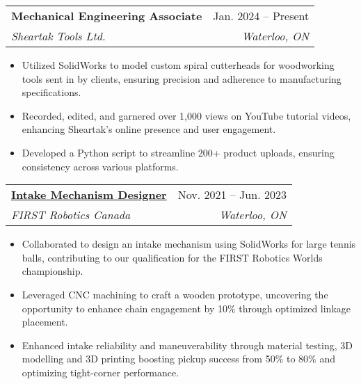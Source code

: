 \documentclass[letterpaper]{article}
\makeatletter
\newcommand{\resumeItem}[1]{
  \item\small{
    {#1 \vspace{-2pt}}
  }
}
\newcommand{\resumeSubheading}[4]{
  \vspace{-2pt}\item
    \begin{tabular*}{0.97\textwidth}[t]{l@{\extracolsep{\fill}}r}
      \textbf{#1} & #2 \\
      \textit{\small#3} & \textit{\small #4} \\
    \end{tabular*}\vspace{-7pt}
}
\newcommand{\resumeSubSubheading}[2]{
    \item
    \begin{tabular*}{0.97\textwidth}{l@{\extracolsep{\fill}}r}
      \textit{\small#1} & \textit{\small #2} \\
    \end{tabular*}\vspace{-7pt}
}
\newcommand{\resumeSubHeadingListEnd}{\end{itemize}}
\newcommand{\resumeItemListStart}{\begin{itemize}}
\newcommand{\resumeItemListEnd}{\end{itemize}\vspace{-5pt}}
\makeatother
\begin{document}
    \resumeSubheading
      {Mechanical Engineering Associate}{Jan. 2024 -- Present}
      {Sheartak Tools Ltd.}{Waterloo, ON}
      \resumeItemListStart
        \resumeItem{Utilized SolidWorks to model custom spiral cutterheads for woodworking tools sent in by clients, ensuring precision and adherence to manufacturing specifications.}
        \resumeItem{Recorded, edited, and garnered over 1,000 views on YouTube tutorial videos, enhancing Sheartak's online presence and user engagement.}
        \resumeItem{Developed a Python script to streamline 200+ product uploads, ensuring consistency across various platforms.}
      \resumeItemListEnd

    \resumeSubheading
      {\href{https://www.gavintranquilino.com/rapid-react.html}{Intake Mechanism Designer}}{Nov. 2021 -- Jun. 2023}
      {FIRST Robotics Canada}{Waterloo, ON}
      \resumeItemListStart
        \resumeItem{Collaborated to design an intake mechanism using SolidWorks for large tennis balls, contributing to our qualification for the FIRST Robotics Worlds championship.}
        \resumeItem{Leveraged CNC machining to craft a wooden prototype, uncovering the opportunity to enhance chain engagement by 10\% through optimized linkage placement.}
        \resumeItem{Enhanced intake reliability and maneuverability through material testing, 3D modelling and 3D printing boosting pickup success from 50\% to 80\% and optimizing tight-corner performance.}
      \resumeItemListEnd
      

\end{document}
